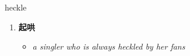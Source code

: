 
\begin{frame}
{\huge heckle}
\begin{center}
\begin{enumerate}\Large
  \item \textbf{起哄}
  \begin{itemize}
    \item \em{\Large{a singler who is always heckled by her fans}}
  \end{itemize}
\end{enumerate}
\end{center}
\end{frame}
